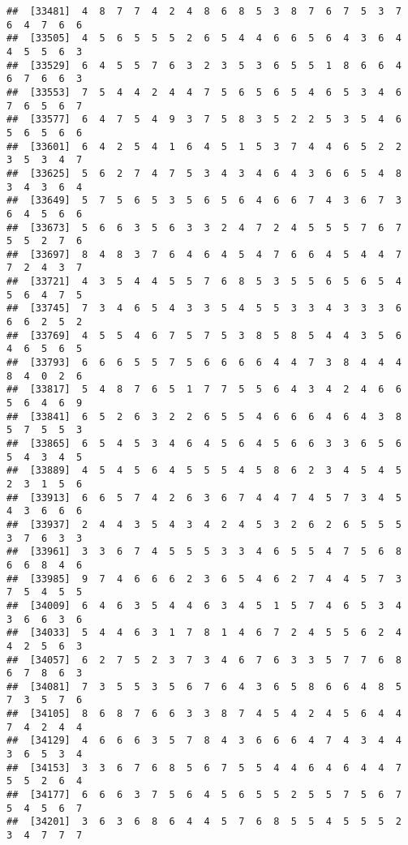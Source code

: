 \documentclass[
]{book}
\begin{document}
\begin{verbatim}
##  [33481]  4  8  7  7  4  2  4  8  6  8  5  3  8  7  6  7  5  3  7  6  4  7  6  6
##  [33505]  4  5  6  5  5  5  2  6  5  4  4  6  6  5  6  4  3  6  4  4  5  5  6  3
##  [33529]  6  4  5  5  7  6  3  2  3  5  3  6  5  5  1  8  6  6  4  6  7  6  6  3
##  [33553]  7  5  4  4  2  4  4  7  5  6  5  6  5  4  6  5  3  4  6  7  6  5  6  7
##  [33577]  6  4  7  5  4  9  3  7  5  8  3  5  2  2  5  3  5  4  6  5  6  5  6  6
##  [33601]  6  4  2  5  4  1  6  4  5  1  5  3  7  4  4  6  5  2  2  3  5  3  4  7
##  [33625]  5  6  2  7  4  7  5  3  4  3  4  6  4  3  6  6  5  4  8  3  4  3  6  4
##  [33649]  5  7  5  6  5  3  5  6  5  6  4  6  6  7  4  3  6  7  3  6  4  5  6  6
##  [33673]  5  6  6  3  5  6  3  3  2  4  7  2  4  5  5  5  7  6  7  5  5  2  7  6
##  [33697]  8  4  8  3  7  6  4  6  4  5  4  7  6  6  4  5  4  4  7  7  2  4  3  7
##  [33721]  4  3  5  4  4  5  5  7  6  8  5  3  5  5  6  5  6  5  4  5  6  4  7  5
##  [33745]  7  3  4  6  5  4  3  3  5  4  5  5  3  3  4  3  3  3  6  6  6  2  5  2
##  [33769]  4  5  5  4  6  7  5  7  5  3  8  5  8  5  4  4  3  5  6  4  6  5  6  5
##  [33793]  6  6  6  5  5  7  5  6  6  6  6  4  4  7  3  8  4  4  4  8  4  0  2  6
##  [33817]  5  4  8  7  6  5  1  7  7  5  5  6  4  3  4  2  4  6  6  5  6  4  6  9
##  [33841]  6  5  2  6  3  2  2  6  5  5  4  6  6  6  4  6  4  3  8  5  7  5  5  3
##  [33865]  6  5  4  5  3  4  6  4  5  6  4  5  6  6  3  3  6  5  6  5  4  3  4  5
##  [33889]  4  5  4  5  6  4  5  5  5  4  5  8  6  2  3  4  5  4  5  2  3  1  5  6
##  [33913]  6  6  5  7  4  2  6  3  6  7  4  4  7  4  5  7  3  4  5  4  3  6  6  6
##  [33937]  2  4  4  3  5  4  3  4  2  4  5  3  2  6  2  6  5  5  5  3  7  6  3  3
##  [33961]  3  3  6  7  4  5  5  5  3  3  4  6  5  5  4  7  5  6  8  6  6  8  4  6
##  [33985]  9  7  4  6  6  6  2  3  6  5  4  6  2  7  4  4  5  7  3  7  5  4  5  5
##  [34009]  6  4  6  3  5  4  4  6  3  4  5  1  5  7  4  6  5  3  4  3  6  6  3  6
##  [34033]  5  4  4  6  3  1  7  8  1  4  6  7  2  4  5  5  6  2  4  4  2  5  6  3
##  [34057]  6  2  7  5  2  3  7  3  4  6  7  6  3  3  5  7  7  6  8  6  7  8  6  3
##  [34081]  7  3  5  5  3  5  6  7  6  4  3  6  5  8  6  6  4  8  5  7  3  5  7  6
##  [34105]  8  6  8  7  6  6  3  3  8  7  4  5  4  2  4  5  6  4  4  7  4  2  4  4
##  [34129]  4  6  6  6  3  5  7  8  4  3  6  6  6  4  7  4  3  4  4  3  6  5  3  4
##  [34153]  3  3  6  7  6  8  5  6  7  5  5  4  4  6  4  6  4  4  7  5  5  2  6  4
##  [34177]  6  6  6  3  7  5  6  4  5  6  5  5  2  5  5  7  5  6  7  5  4  5  6  7
##  [34201]  3  6  3  6  8  6  4  4  5  7  6  8  5  5  4  5  5  5  2  3  4  7  7  7

\end{verbatim}
\end{document}

